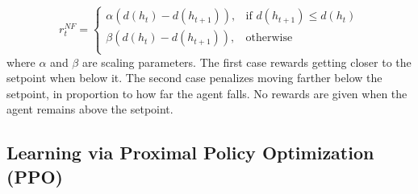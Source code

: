 \documentclass[12pt,fleqn]{article}
\begin{document}
\begin{equation}\label{eq:reward-nf}
  r^{NF}_t =
  \begin{cases}
    \alpha\left(d(h_t) - d(h_{t+1})\right), & \text{if } d(h_{t+1}) \le d(h_t) \\
    \beta\left(d(h_t) - d(h_{t+1})\right),  & \text{otherwise}                 \\
  \end{cases}
\end{equation}
where \(\alpha\) and \(\beta\) are scaling parameters. The first case rewards getting closer to the setpoint when below it. The second case penalizes moving farther below the setpoint, in proportion to how far the agent falls. No rewards are given when the agent remains above the setpoint.

\subsection{Learning via Proximal Policy Optimization (PPO)}\label{sec:ppo}
\end{document}
